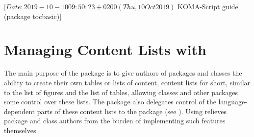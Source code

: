 %
%
%
%
%
%
%
%
% 
%
%
%
%

                 [$Date: 2019-10-10 09:50:23 +0200 (Thu, 10 Oct 2019) $
                  KOMA-Script guide (package tocbasic)]



\chapter{Managing Content Lists with }
\BeginIndexGroup%
%
%
%
%
The main purpose of the  package is to give authors of
packages and classes the ability to create their own tables or lists of
content, content lists for short, similar to the list of figures and the list
of tables, allowing classes and other packages some control over these lists.
The  package also delegates control of the
language-dependent parts of these content lists to the
 package (see \cite{package:babel}). Using
 relieves package and class authors from the burden of
implementing such features themselves.

